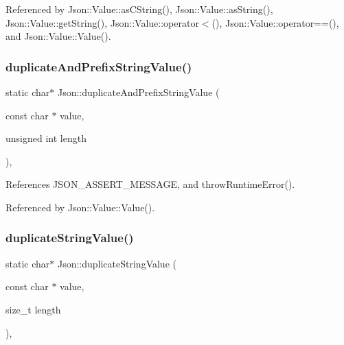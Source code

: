 Referenced by Json\+::\+Value\+::as\+C\+String(), Json\+::\+Value\+::as\+String(), Json\+::\+Value\+::get\+String(), Json\+::\+Value\+::operator$<$(), Json\+::\+Value\+::operator==(), and Json\+::\+Value\+::\+Value().

\mbox{\label{namespaceJson_a9795a09a0141d1f12d307c4386aeaee6_a9795a09a0141d1f12d307c4386aeaee6}} 
\subsubsection{\texorpdfstring{duplicate\+And\+Prefix\+String\+Value()}{duplicateAndPrefixStringValue()}}
{\footnotesize\ttfamily static char$\ast$ Json\+::duplicate\+And\+Prefix\+String\+Value (\begin{DoxyParamCaption}\item[{const char $\ast$}]{value,  }\item[{unsigned int}]{length }\end{DoxyParamCaption})\hspace{0.3cm}{\ttfamily [inline]}, {\ttfamily [static]}}



References J\+S\+O\+N\+\_\+\+A\+S\+S\+E\+R\+T\+\_\+\+M\+E\+S\+S\+A\+GE, and throw\+Runtime\+Error().



Referenced by Json\+::\+Value\+::\+Value().

\mbox{\label{namespaceJson_a678ac3a60cd70ec0fb4c9abfd40eb0c4_a678ac3a60cd70ec0fb4c9abfd40eb0c4}} 
\subsubsection{\texorpdfstring{duplicate\+String\+Value()}{duplicateStringValue()}}
{\footnotesize\ttfamily static char$\ast$ Json\+::duplicate\+String\+Value (\begin{DoxyParamCaption}\item[{const char $\ast$}]{value,  }\item[{size\+\_\+t}]{length }\end{DoxyParamCaption})\hspace{0.3cm}{\ttfamily [inline]}, {\ttfamily [static]}}

